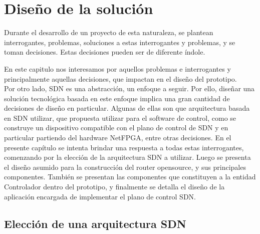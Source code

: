 \chapter{Dise\~no de la soluci\'on}

\ifpdf
    \graphicspath{{Chapter3/Figs/Raster/}{Chapter3/Figs/PDF/}{Chapter3/Figs/}}
\else
    \graphicspath{{Chapter3/Figs/Vector/}{Chapter3/Figs/}}
\fi

Durante el desarrollo de un proyecto de esta naturaleza, se plantean interrogantes, problemas, soluciones a estas interrogantes y problemas, y se toman decisiones. Estas decisiones pueden ser de diferente \'indole. 

En este capitulo nos interesamos por aquellos problemas e interrogantes y principalmente aquellas decisiones, que impactan en el dise\~no del prototipo.\\

Por otro lado, SDN es una abstracci\'on, un enfoque a seguir. Por ello, dise\~nar una soluci\'on tecnol\'ogica basada en este enfoque implica una gran cantidad de decisiones de dise\~no en particular. Algunas de ellas son que arquitectura basada en SDN utilizar, que propuesta utilizar para el software de control, como se construye un dispositivo compatible con el plano de control de SDN y en particular partiendo del hardware NetFPGA, entre otras decisiones. En el presente cap\'itulo se intenta brindar una respuesta a todas estas interrogantes, comenzando por la elecci\'on de la arquitectura SDN a utilizar. Luego se presenta el dise\~no asumido para la construcci\'on del router opensource, y sus principales componentes. Tambi\'en se presentan las componentes que constituyen a la entidad Controlador dentro del prototipo, y finalmente se detalla el dise\~no de la aplicaci\'on encargada de implementar el plano de control SDN.
 
\section[Elecci\'on de una arquitectura SDN]{Elecci\'on de una arquitectura SDN}


 
